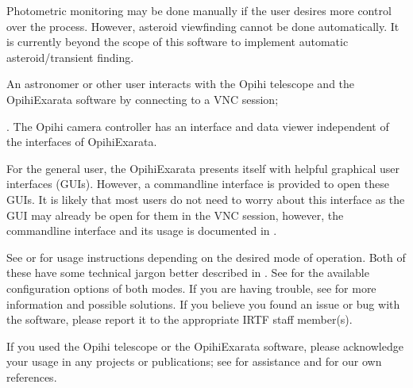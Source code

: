 \documentclass[letterpaper,11pt,english]{sphinxmanual}
\begin{document}
\sphinxAtStartPar
Photometric monitoring may be done manually if the user desires more control
over the process. However, asteroid view\sphinxhyphen{}finding cannot be done automatically.
It is currently beyond the scope of this software to implement automatic
asteroid/transient finding.

\sphinxAtStartPar
An astronomer or other user interacts with the Opihi telescope and the
OpihiExarata software by connecting to a VNC session; %
\begin{footnote}[2]\sphinxAtStartFootnote
{}
%
\end{footnote}.
The Opihi camera controller has an interface and data viewer independent of
the interfaces of OpihiExarata.

\sphinxAtStartPar
For the general user, the OpihiExarata presents itself with helpful graphical
user interfaces (GUIs). However, a command\sphinxhyphen{}line interface is provided to
open these GUIs. It is likely that most users do not need to worry about this
interface as the GUI may already be open for them in the VNC session, however,
the command\sphinxhyphen{}line interface and its usage is documented in
{\hyperref[\detokenize{user/command_line:user-command-line}]{}}.

\sphinxAtStartPar
See {\hyperref[\detokenize{user/manual_mode:user-manual-mode}]{}} or {\hyperref[\detokenize{user/automatic_mode:user-automatic-mode}]{}} for usage instructions
depending on the desired mode of operation. Both of these have some technical
jargon better described in {\hyperref[\detokenize{user/system_framework:user-system-framework}]{}}. See
{\hyperref[\detokenize{user/configuration:user-configuration}]{}} for the available configuration options of both
modes. If you are having trouble, see {\hyperref[\detokenize{user/troubleshooting:user-troubleshooting}]{}} for more
information and possible solutions. If you believe you found an issue or bug
with the software, please report it to the appropriate IRTF staff member(s).

\sphinxAtStartPar
If you used the Opihi telescope or the OpihiExarata software, please
acknowledge your usage in any projects or publications; see
{\hyperref[\detokenize{user/citations:user-citations}]{}} for assistance and for our own references.
\end{document}

